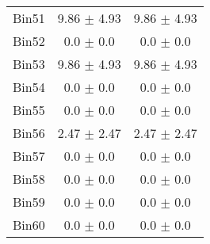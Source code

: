 \begin{tabular}{|c|c|c|}
     Bin51 & 9.86 $\pm$ 4.93 & 9.86 $\pm$ 4.93 \\ \cline{1-3} 
     Bin52 & 0.0 $\pm$ 0.0 & 0.0 $\pm$ 0.0 \\ \cline{1-3} 
     Bin53 & 9.86 $\pm$ 4.93 & 9.86 $\pm$ 4.93 \\ \cline{1-3} 
     Bin54 & 0.0 $\pm$ 0.0 & 0.0 $\pm$ 0.0 \\ \cline{1-3} 
     Bin55 & 0.0 $\pm$ 0.0 & 0.0 $\pm$ 0.0 \\ \cline{1-3} 
     Bin56 & 2.47 $\pm$ 2.47 & 2.47 $\pm$ 2.47 \\ \cline{1-3} 
     Bin57 & 0.0 $\pm$ 0.0 & 0.0 $\pm$ 0.0 \\ \cline{1-3} 
     Bin58 & 0.0 $\pm$ 0.0 & 0.0 $\pm$ 0.0 \\ \cline{1-3} 
     Bin59 & 0.0 $\pm$ 0.0 & 0.0 $\pm$ 0.0 \\ \cline{1-3} 
     Bin60 & 0.0 $\pm$ 0.0 & 0.0 $\pm$ 0.0 \\ \cline{1-3} 
  \end{tabular}
